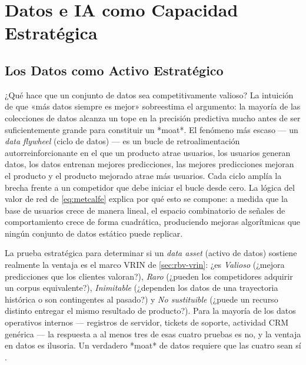 \chapter{Datos e IA como Capacidad Estratégica}\label{ch:data-and-ai-strategy}


\section{Los Datos como Activo Estratégico}\label{sec:data-asset}

¿Qué hace que un conjunto de datos sea competitivamente valioso? La intuición de que «más datos siempre es mejor»
sobreestima el argumento: la mayoría de las colecciones de datos alcanza un tope en la precisión predictiva mucho antes
de ser suficientemente grande para constituir un *moat*. El fenómeno más escaso — un \emph{data flywheel}
(ciclo de datos) — es un bucle de retroalimentación autorreinforcionante en el que un producto atrae
usuarios, los usuarios generan datos, los datos entrenan mejores predicciones, las mejores predicciones
mejoran el producto y el producto mejorado atrae más usuarios. Cada ciclo amplía la brecha frente a un
competidor que debe iniciar el bucle desde cero. La lógica del valor de red de \cref{eq:metcalfe}
explica por qué esto se compone: a medida que la base de usuarios crece de manera lineal, el espacio
combinatorio de señales de comportamiento crece de forma cuadrática, produciendo mejoras algorítmicas
que ningún conjunto de datos estático puede replicar.

La prueba estratégica para determinar si un \emph{data asset} (activo de datos) sostiene realmente la
ventaja es el marco VRIN de \cref{sec:rbv-vrin}: ¿es \emph{Valioso} (¿mejora predicciones que los
clientes valoran?), \emph{Raro} (¿pueden los competidores adquirir un corpus equivalente?),
\emph{Inimitable} (¿dependen los datos de una trayectoria histórica o son contingentes al pasado?)
y \emph{No sustituible} (¿puede un recurso distinto entregar el mismo resultado de producto?). Para
la mayoría de los datos operativos internos — registros de servidor, tickets de soporte, actividad CRM
genérica — la respuesta a al menos tres de esas cuatro pruebas es no, y la ventaja en datos es
ilusoria. Un verdadero *moat* de datos requiere que las cuatro sean sí
\parencite{agrawal2018prediction}.

